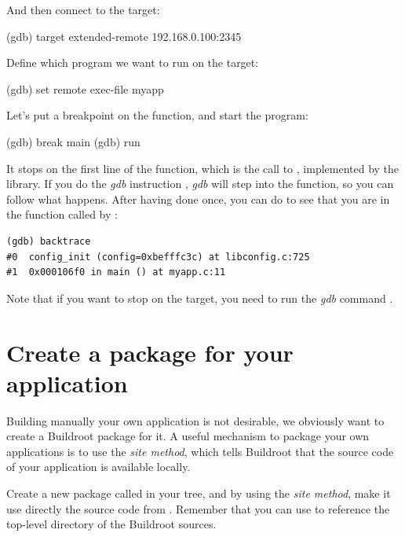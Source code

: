 And then connect to the target:

\begin{bashinput}
(gdb) target extended-remote 192.168.0.100:2345
\end{bashinput}

Define which program we want to run on the target:

\begin{bashinput}
(gdb) set remote exec-file myapp
\end{bashinput}

Let's put a breakpoint on the  function, and start the
program:

\begin{bashinput}
(gdb) break main
(gdb) run
\end{bashinput}

It stops on the first line of the  function, which is the
call to , implemented by the 
library. If you do the {\em gdb} instruction , {\em gdb}
will step into the function, so you can follow what happens. After
having done  once, you can do  to see that
you are in the function  called by :

\begin{verbatim}
(gdb) backtrace
#0  config_init (config=0xbefffc3c) at libconfig.c:725
#1  0x000106f0 in main () at myapp.c:11
\end{verbatim}

Note that if you want  to stop on the target, you need
to run the {\em gdb} command .

\section{Create a package for your application}

Building manually your own application is not desirable, we obviously
want to create a Buildroot package for it. A useful mechanism to
package your own applications is to use the
 {\em site method}, which tells Buildroot that the source
code of your application is available locally.

Create a new package called  in your 
tree, and by using the  {\em site method}, make it use
directly the  source code from
. Remember that you can use 
to reference the top-level directory of the Buildroot sources.

